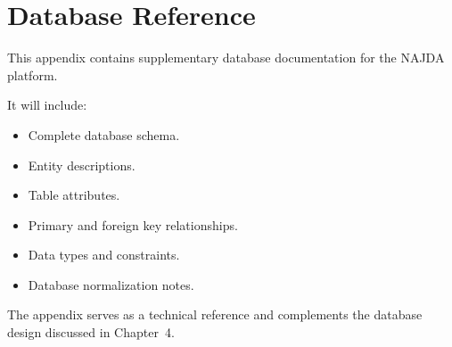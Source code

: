 \chapter{Database Reference}
\label{appendix:database}

This appendix contains supplementary database documentation for the NAJDA platform.

It will include:

\begin{itemize}
    \item Complete database schema.
    \item Entity descriptions.
    \item Table attributes.
    \item Primary and foreign key relationships.
    \item Data types and constraints.
    \item Database normalization notes.
\end{itemize}

The appendix serves as a technical reference and complements the database design discussed in Chapter~4.